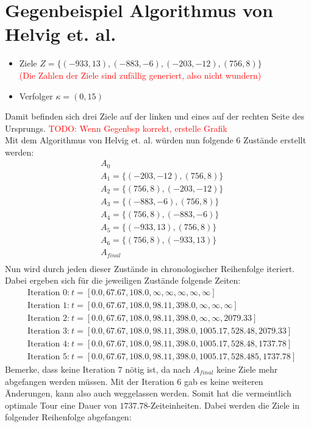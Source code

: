 \documentclass{scrartcl}
\begin{document}
\section{Gegenbeispiel Algorithmus von Helvig et. al.}

\begin{itemize}
\item
Ziele $Z=\{(-933,13),(-883,-6),(-203,-12),(756,8)\}$\\
\textcolor{red}{(Die Zahlen der Ziele sind zufällig generiert, also nicht wundern)}
\item
Verfolger $\kappa=(0,15)$
\end{itemize}
Damit befinden sich drei Ziele auf der linken und eines auf der rechten Seite des Ursprungs.
\textcolor{red}{TODO: Wenn Gegenbsp korrekt, erstelle Grafik}\\
Mit dem Algorithmus von Helvig et. al. würden nun folgende 6 Zustände erstellt werden:
\begin{align*}
&A_0 \\
&A_1 = \{(-203, -12), (756, 8)\} \\
&A_2 = \{(756, 8), (-203, -12)\} \\
&A_3 = \{(-883, -6), (756, 8)\} \\
&A_4 = \{(756, 8), (-883, -6)\} \\
&A_5 = \{(-933, 13), (756, 8)\} \\
&A_6 = \{(756, 8), (-933, 13)\} \\
&A_{final}  \\
\end{align*}
Nun wird durch jeden dieser Zustände in chronologischer Reihenfolge iteriert. Dabei ergeben sich für die jeweiligen Zustände folgende Zeiten:
\begin{align*}
&\text{Iteration 0:}~t=[0.0, 67.67, 108.0, \infty, \infty, \infty, \infty, \infty] \\
&\text{Iteration 1:}~t=[0.0, 67.67, 108.0, 98.11, 398.0, \infty, \infty, \infty] \\
&\text{Iteration 2:}~t=[0.0, 67.67, 108.0, 98.11, 398.0, \infty, \infty, 2079.33] \\
&\text{Iteration 3:}~t=[0.0, 67.67, 108.0, 98.11, 398.0, 1005.17, 528.48, 2079.33] \\
&\text{Iteration 4:}~t=[0.0, 67.67, 108.0, 98.11, 398.0, 1005.17, 528.48, 1737.78] \\
&\text{Iteration 5:}~t=[0.0, 67.67, 108.0, 98.11, 398.0, 1005.17, 528.485, 1737.78]
\end{align*}
Bemerke, dass keine Iteration $7$ nötig ist, da nach $A_{final}$ keine Ziele mehr abgefangen werden müssen. Mit der Iteration $6$ gab es keine weiteren Änderungen, kann also auch weggelassen werden. Somit hat die vermeintlich optimale Tour eine Dauer von $1737.78$-Zeiteinheiten. Dabei werden die Ziele in folgender Reihenfolge abgefangen:
\end{document}
